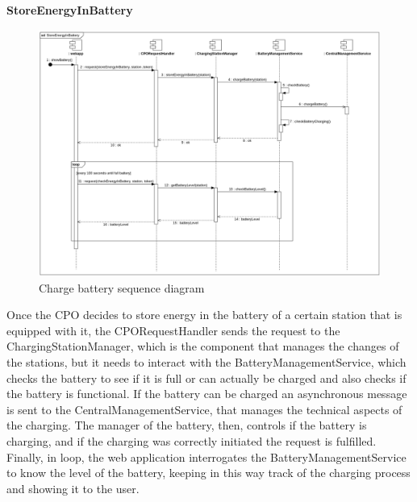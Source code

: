 \clearpage
\textbf{StoreEnergyInBattery}\\
\begin{figure}[H]
    \centering
    \includegraphics[width=1\textwidth]{Images/cp2/runtime/StoreEnergyInBattery.png}
    \caption{Charge battery sequence diagram}
\end{figure}
Once the CPO decides to store energy in the battery of a certain station that is equipped with it, the CPORequestHandler sends the request to the ChargingStationManager, which is the component that manages the changes of the stations, but it needs to interact with the BatteryManagementService, which checks the battery to see if it is full or can actually be charged and also checks if the battery is functional. If the battery can be charged an asynchronous message is sent to the CentralManagementService, that manages the technical aspects of the charging. The manager of the battery, then, controls if the battery is charging, and if the charging was correctly initiated the request is fulfilled. Finally, in loop, the web application interrogates the BatteryManagementService to know the level of the battery, keeping in this way track of the charging process and showing it to the user.  

